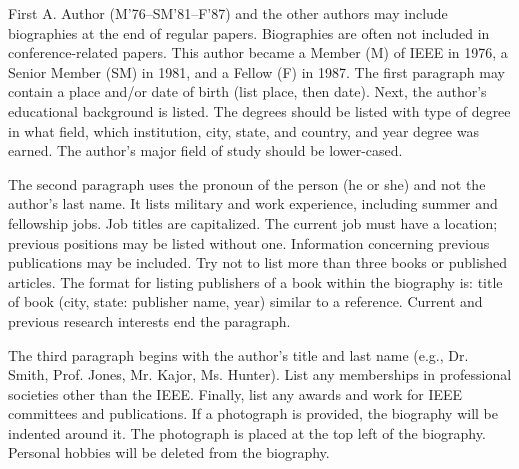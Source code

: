 \documentclass[transmag]{IEEEtran}
\begin{document}
\begin{IEEEbiographynophoto}{First A. Author} (M'76--SM'81--F'87) and the other authors may 
include biographies at the end of regular papers. Biographies are often not 
included in conference-related papers. This author became a Member (M) of 
IEEE in 1976, a Senior Member (SM) in 1981, and a Fellow (F) in 1987. The 
first paragraph may contain a place and/or date of birth (list place, then 
date). Next, the author's educational background is listed. The degrees 
should be listed with type of degree in what field, which institution, city, 
state, and country, and year degree was earned. The author's major field of 
study should be lower-cased.

The second paragraph uses the pronoun of the person (he or she) and not the 
author's last name. It lists military and work experience, including summer 
and fellowship jobs. Job titles are capitalized. The current job must have a 
location; previous positions may be listed without one. Information 
concerning previous publications may be included. Try not to list more than 
three books or published articles. The format for listing publishers of a 
book within the biography is: title of book (city, state: publisher name, 
year) similar to a reference. Current and previous research interests end 
the paragraph.

The third paragraph begins with the author's title and last name (e.g., Dr. 
Smith, Prof. Jones, Mr. Kajor, Ms. Hunter). List any memberships in 
professional societies other than the IEEE. Finally, list any awards and 
work for IEEE committees and publications. If a photograph is provided, the 
biography will be indented around it. The photograph is placed at the top 
left of the biography. Personal hobbies will be deleted from the
biography.
\end{IEEEbiographynophoto}

\fi 
\end{document}
